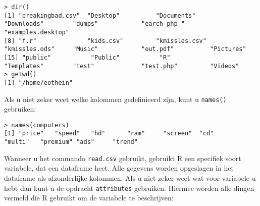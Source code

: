 \begin{lstlisting}
> dir()
[1] "breakingbad.csv"  "Desktop"          "Documents"        "Downloads"        "dumps"            "earch php-"       "examples.desktop"
[8] "f.r"              "kids.csv"         "kmissles.csv"     "kmissles.ods"     "Music"            "out.pdf"          "Pictures"        
[15] "public"           "Public"           "R"                "Templates"        "test"             "test.php"         "Videos"          
> getwd()
[1] "/home/eothein"
\end{lstlisting}

Als u niet zeker weet welke kolommen gedefinieerd zijn, kunt u \texttt{names()} gebruiken:

\begin{lstlisting}
> names(computers)
[1] "price"   "speed"   "hd"      "ram"     "screen"  "cd"      "multi"   "premium" "ads"     "trend"
\end{lstlisting}

Wanneer u het commando \texttt{read.csv} gebruikt, gebruikt R een specifiek soort variabele, dat een dataframe heet. Alle gegevens worden opgeslagen in het dataframe als afzonderlijke kolommen. Als u niet zeker weet wat voor variabele u hebt dan kunt u de opdracht \texttt{attributes} gebruiken. Hiermee worden alle dingen vermeld die R gebruikt om de variabele te beschrijven:

